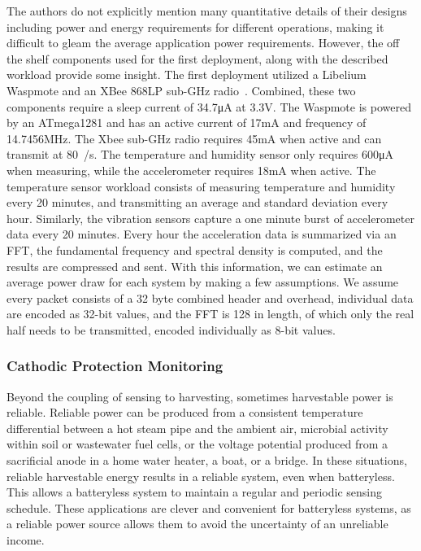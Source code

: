 The authors do not explicitly mention many quantitative details of their designs including power and energy requirements for different operations, making it difficult to gleam the average application power requirements.
However, the off the shelf components used for the first deployment, along with the described workload provide some insight. 
The first deployment utilized a Libelium Waspmote and an XBee 868LP sub-\si{\giga\hertz} radio~\cite{waspmote,xbeeradio}.
Combined, these two components require a sleep current of 34.7\si{\micro\ampere} at 3.3\si{\volt}.
The Waspmote is powered by an ATmega1281 and has an active current of 17\si{\milli\ampere} and frequency of 14.7456\si{\mega\hertz}.
The Xbee sub-\si{\giga\hertz} radio requires 45\si{\milli\ampere} when active and can transmit at 80\si[per-mode=symbol]{\kilo\bit\per\second}.
The temperature and humidity sensor only requires 600\si{\micro\ampere} when measuring, while the accelerometer requires 18\si{\milli\ampere} when active.
The temperature sensor workload consists of measuring temperature and humidity every 20 minutes, and transmitting an average and standard deviation every hour. 
Similarly, the vibration sensors capture a one minute burst of accelerometer data every 20 minutes.
Every hour the acceleration data is summarized via an FFT, the fundamental frequency and spectral density is computed, and the results are compressed and sent.
With this information, we can estimate an average power draw for each system by making a few assumptions.
We assume every packet consists of a 32 byte combined header and overhead, individual data are encoded as 32-bit values, and the FFT is 128 in length, of which only the real half needs to be transmitted, encoded individually as 8-bit values.



\subsubsection{Cathodic Protection Monitoring}
Beyond the coupling of sensing to harvesting, sometimes harvestable power is reliable. 
Reliable power can be produced from a consistent temperature differential between a hot steam pipe and the ambient air, microbial activity within soil or wastewater fuel cells, or the voltage potential produced from a sacrificial anode in a home water heater, a boat, or a bridge.
In these situations, reliable harvestable energy results in a reliable system, even when batteryless.
This allows a batteryless system to maintain a regular and periodic sensing schedule.
These applications are clever and convenient for batteryless systems, as a reliable power source allows them to avoid the uncertainty of an unreliable income. 

